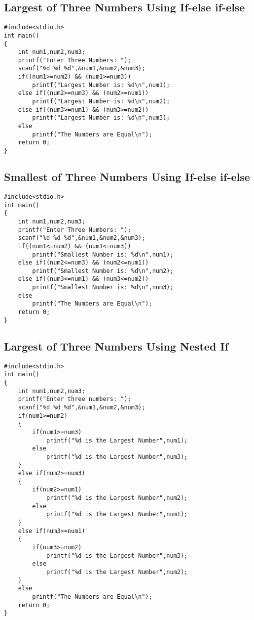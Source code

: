 \documentclass[a4paper,14pt]{article}
\begin{document}
\subsection{Largest of Three Numbers Using If-else if-else}
\vspace{0.5cm}
\begin{lstlisting}[caption={Largest of Three Numbers Using If-else if-else}]
#include<stdio.h>
int main()
{
    int num1,num2,num3;
    printf("Enter Three Numbers: ");
    scanf("%d %d %d",&num1,&num2,&num3);
    if((num1>=num2) && (num1>=num3))
        printf("Largest Number is: %d\n",num1);
    else if((num2>=num3) && (num2>=num1))
        printf("Largest Number is: %d\n",num2);
    else if((num3>=num1) && (num3>=num2))
        printf("Largest Number is: %d\n",num3);
    else
        printf("The Numbers are Equal\n");
    return 0;
}
\end{lstlisting}
\newpage

\subsection{Smallest of Three Numbers Using If-else if-else}
\vspace{0.5cm}
\begin{lstlisting}[caption={Smallest of Three Numbers Using If-else if-else}]
#include<stdio.h>
int main()
{
    int num1,num2,num3;
    printf("Enter Three Numbers: ");
    scanf("%d %d %d",&num1,&num2,&num3);
    if((num1<=num2) && (num1<=num3))
        printf("Smallest Number is: %d\n",num1);
    else if((num2<=num3) && (num2<=num1))
        printf("Smallest Number is: %d\n",num2);
    else if((num3<=num1) && (num3<=num2))
        printf("Smallest Number is: %d\n",num3);
    else
        printf("The Numbers are Equal\n");
    return 0;
}
\end{lstlisting}
\newpage

\subsection{Largest of Three Numbers Using Nested If}
\vspace{0.5cm}
\begin{lstlisting}[caption={Largest of Three Numbers Using Nested If}]
#include<stdio.h>
int main()
{
    int num1,num2,num3;
    printf("Enter three numbers: ");
    scanf("%d %d %d",&num1,&num2,&num3);
    if(num1>=num2)
    {
        if(num1>=num3)
            printf("%d is the Largest Number",num1);
        else
            printf("%d is the Largest Number",num3);
    }
    else if(num2>=num3)
    {
        if(num2>=num1)
            printf("%d is the Largest Number",num2);
        else
            printf("%d is the Largest Number",num1);
    }
    else if(num3>=num1)
    {
        if(num3>=num2)
            printf("%d is the Largest Number",num3);
        else
            printf("%d is the Largest Number",num2);
    }
    else
        printf("The Numbers are Equal\n");
    return 0;
}
\end{lstlisting}
\newpage
\end{document}
